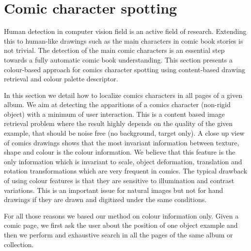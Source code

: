 



\section{Comic character spotting}
\label{sec:in:character_spotting}
Human detection in computer vision field is an active field of research. Extending this to human-like drawings such as the main characters in comic book stories is not trivial.
The detection of the main comic characters is an essential step towards a fully automatic comic book understanding.
This section presents a colour-based approach for comics character spotting using content-based drawing retrieval and colour palette descriptor.

In this section we detail how to localize comics characters in all pages of a given album.
We aim at detecting the apparitions of a comics character (non-rigid object) with a minimum of user interaction. This is a content based image retrieval problem where the result highly depends on the quality of the given example, that should be noise free (no background, target only). 
A close up view of comics drawings shows that the most invariant information between texture, shape and colour is the colour information. We believe that this feature is the only information which is invariant to scale, object deformation, translation and rotation transformations which are very frequent in comics. The typical drawback of using colour features is that they are sensitive to illumination and contrast variations. This is an important issue for natural images but not for hand drawings if they are drawn and digitized under the same conditions. 

For all those reasons we based our method on colour information only.
Given a comic page, we first ask the user about the position of one object example and then we perform and exhaustive search in all the pages of the same album or collection.

